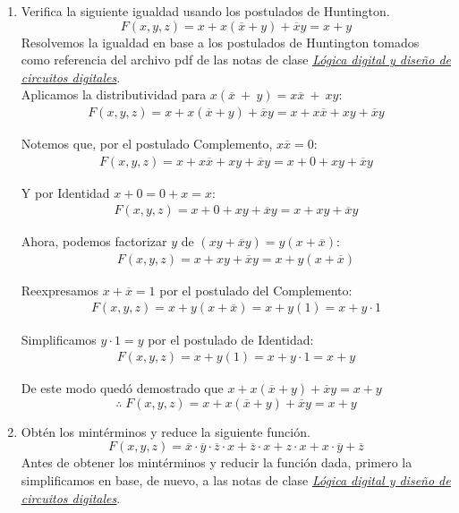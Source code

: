 \documentclass[12pt,letterpaper]{article}
\begin{document}
\begin{enumerate}[label=\arabic*.]
\item Verifica la siguiente igualdad usando los postulados de Huntington.
  \[
  F(x, y, z) = x + x(\overline{x} + y) + \overline{x}y = x + y
  \]
  Resolvemos la igualdad en base a los postulados de Huntington tomados como referencia del archivo pdf de las notas de clase \href{https://drive.google.com/file/d/1BdCwuwFcSar5W5nPxA98FVNfTxZfd6yg/view}{\textit{\uline{Lógica digital y diseño de circuitos digitales}}}.\\

  Aplicamos la distributividad para $x(\overline{x}\: +\: y) = x\overline{x}\: +\: xy$:
  \begin{align*}
    F(x, y, z) = x + x(\overline{x} + y) + \overline{x}y =  x + x\overline{x} + xy + \overline{x}y
  \end{align*}

  Notemos que, por el postulado Complemento, $x\overline{x} = 0$:
  \begin{align*}
    F(x, y, z) = x + x\overline{x} + xy + \overline{x}y = x + 0 + xy + \overline{x}y
  \end{align*}

  Y por Identidad $x + 0 = 0 + x = x$:
  \begin{align*}
    F(x, y, z) =  x + 0 + xy + \overline{x}y = x + xy + \overline{x}y
  \end{align*}

  Ahora, podemos factorizar $y$ de $(xy + \overline{x}y) = y(x + \overline{x})$:
  \begin{align*}
    F(x, y, z) = x + xy + \overline{x}y = x + y(x + \overline{x})
  \end{align*}

  Reexpresamos $x + \overline{x} = 1$ por el postulado del Complemento:
  \begin{align*}
    F(x, y, z) = x + y(x + \overline{x}) = x + y(1) = x + y \cdot 1
  \end{align*}

  Simplificamos $y \cdot 1 = y$ por el postulado de Identidad:
  \begin{align*}
    F(x, y, z) =  x + y(1) = x + y \cdot 1 = x + y
  \end{align*}

  De este modo qued\'{o} demostrado que $x + x(\overline{x} + y) + \overline{x}y = x + y$
  \[
  \therefore \; F(x, y, z) = x + x(\overline{x} + y) + \overline{x}y = x + y
  \]
  \bigskip
  
\item Obtén los mint\'{e}rminos y reduce la siguiente función.
  \[
  F(x, y, z) = \overline{x} \cdot \overline{y} \cdot \overline{z} \cdot x + \overline{z} \cdot x + z \cdot x + x \cdot \overline{y} + \overline{z}
  \]
  Antes de obtener los mint\'{e}rminos y reducir la funci\'{o}n dada, primero la simplificamos en base, de nuevo, a las notas de clase \href{https://drive.google.com/file/d/1BdCwuwFcSar5W5nPxA98FVNfTxZfd6yg/view}{\textit{\uline{Lógica digital y diseño de circuitos digitales}}}.\\


\end{enumerate}
\end{document}
